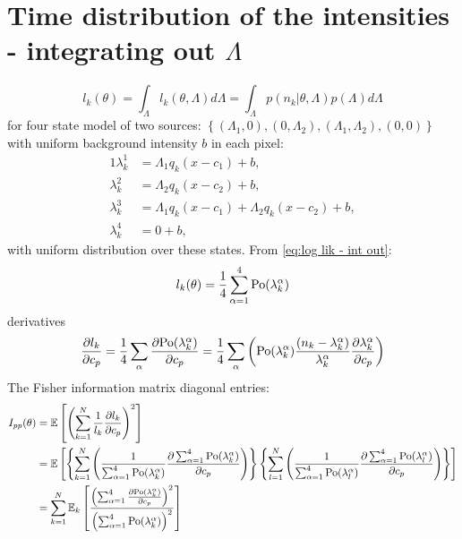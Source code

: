 
\section{Time distribution of the intensities - integrating out $\Lambda$}
\label{sub:Appendix Time-distribution-Integrating out}

\begin{equation}
	l_k(\theta)=\int_{\Lambda}l_k(\theta,\Lambda)d\Lambda=\int_{\Lambda}p(n_k|\theta,\Lambda)p(\Lambda)d\Lambda
	\label{eq:log lik - int out}
\end{equation}
%
for four state model of two sources: $\left\{ (\Lambda_1,0),(0,\Lambda_2),(\Lambda_1,\Lambda_2),(0,0)\right\}$ with uniform background intensity $b$ in each pixel: 
\begin{alignat*}{1}
	\lambda_k^1&=\Lambda_1q_k(x-c_1)+b,\\ 
	\lambda_k^2&=\Lambda_2q_k(x-c_2)+b,\\ 
	\lambda_k^3&=\Lambda_1q_k(x-c_1)+\Lambda_2q_k(x-c_2)+b,\\ 
	\lambda_k^4&=0+b,
\end{alignat*}
%
with uniform distribution over these states. From \autoref{eq:log lik - int out}:
%
\begin{equation}
	l_k(\theta)=\frac{1}{4}\sum_{\alpha=1}^4\mathrm{Po}(\lambda_k^\alpha)
\end{equation}
%
derivatives 
%
\begin{equation}
	\frac{\partial l_k}{\partial c_p}=\frac{1}{4}\sum_\alpha\frac{\partial\mathrm{Po}(\lambda_k^\alpha)}{\partial c_p}=\frac{1}{4}\sum_\alpha\left(\mathrm{Po}(\lambda_k^\alpha)\frac{(n_k-\lambda_k^\alpha)}{\lambda_k^\alpha}\frac{\partial\lambda_k^\alpha}{\partial c_p}\right)
\end{equation}
%
The Fisher information matrix diagonal entries:
%
\begin{alignat}{1}
	I_{pp}(\theta) & =\mathbb{E}\left[\left(\sum_{k=1}^N\frac{1}{l_k}\frac{\partial l_k}{\partial c_p}\right)^2\right]\nonumber \\
 	& =\mathbb{E}\left[\left\{ \sum_{k=1}^N\left(\frac{1}{\sum_{\alpha=1}^4\mathrm{Po}(\lambda_k^\alpha)}\frac{\partial\sum_{\alpha=1}^4\mathrm{Po}(\lambda_k^\alpha)}{\partial c_p}\right)\right\} \left\{ \sum_{l=1}^N\left(\frac{1}{\sum_{\alpha=1}^4\mathrm{Po}(\lambda_l^\alpha)}\frac{\partial\sum_{\alpha=1}^4\mathrm{Po}(\lambda_l^\alpha)}{\partial c_p}\right)\right\} \right]\nonumber \\
	& =\sum_{k=1}^N\mathbb{E}_k\left[\frac{\left(\sum_{\alpha=1}^4\frac{\partial\mathrm{Po}(\lambda_k^\alpha)}{\partial c_p}\right)^2}{\left(\sum_{\alpha=1}^4\mathrm{Po}(\lambda_k^\alpha)\right)^2}\right]
	\label{eq:Fisher Info Integrated Out - diagonal entries}
\end{alignat}
